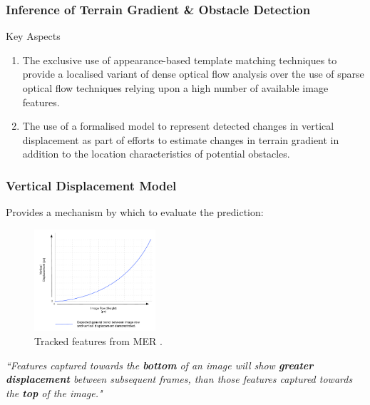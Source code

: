 \documentclass[10pt, compress]{beamer}
\begin{document}
\begin{frame}[fragile]
  \frametitle{Inference of Terrain Gradient \& Obstacle Detection}

  \begin{block}{Key Aspects}
   
  \begin{enumerate}[label={\arabic*.}]
  \item The exclusive use of appearance-based template matching techniques to provide a localised variant of dense optical flow analysis over the use of sparse optical flow techniques relying upon a high number of available image features.
  \item The use of a formalised model to represent detected changes in vertical displacement as part of efforts to estimate changes in terrain gradient in addition to the location characteristics of potential obstacles. 
\end{enumerate}
  
 \end{block}
 
\end{frame}

\begin{frame}[fragile]
  \frametitle{Vertical Displacement Model}
  
  \vspace{-20pt}

 Provides a mechanism by which to evaluate the prediction:
 
 \vspace{10pt}
 
       \begin{figure}
   \vspace{-20pt}
  \begin{center}
    \includegraphics[width=0.4\textwidth]{model.pdf}
  \end{center}
  \vspace{-15pt}
  \caption{\small Tracked features from MER \cite{mars}.}
  \end{figure}
   
   
  \textit{``Features captured towards the \textbf{bottom} of an image will show \textbf{greater displacement} between subsequent frames, than those features captured towards the \textbf{top} of the image."}

   
\end{frame}
\end{document}
